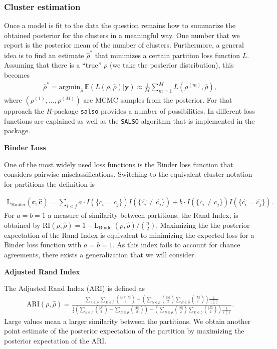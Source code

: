 \documentclass[12pt,a4paper]{article}
\begin{document}
\subsubsection{Cluster estimation}
Once a model is fit to the data the question remains how to summarize the obtained posterior for the clusters in a meaningful way. One number that we report is the posterior mean of the number of clusters. Furthermore, a general idea is to find an estimate $\hat{\rho}^*$ that minimizes a certain partition loss function $L$. Assuming that there is a ``true'' $\rho$ (we take the posterior distribution), this becomes
\begin{align*}
    \hat{\rho}^* = \text{argmin}_{\hat{\rho}} \ \mathbb{E} ( L(\rho, \hat{\rho}) | \mathbf{y} ) \approx \frac{1}{M} \sum_{m=1}^M L (\rho^{(m)} , \hat{\rho} ),
\end{align*}
where $\left( \rho^{(1)}, \dots , \rho^{(M)} \right)$ are MCMC samples from the posterior. For that approach the $R$-package \texttt{salso} \cite{salso} provides a number of possibilities. In \cite{Dahl2022-salso} different loss functions are explained as well as the \texttt{SALSO} algorithm that is implemented in the package. \medskip

\textbf{Binder Loss}

One of the most widely used loss functions is the Binder loss function that considers pairwise misclassifications. Switching to the equivalent cluster notation for partitions the definition is

\begin{align*}
    \text{L}_{\text{Binder}} (\mathbf{c}, \mathbf{\hat{c}} ) = \sum_{i<j} a \cdot  I (\{ c_i = c_j \}) I (\{ \hat{c_i} \neq \hat{c_j} \} ) +  b \cdot I (\{c_i \neq c_j \}) I (\{ \hat{c_i} = \hat{c_j} \}).
\end{align*}
For $a=b=1$ a measure of similarity between partitions, the Rand Index, is obtained by $\text{RI}(\rho, \hat{\rho}) = 1 -  \text{L}_{\text{Binder}}(\rho, \hat{\rho}) / \binom{n}{2}$. Maximizing the the posterior expectation of the Rand Index is equivalent to minimizing the expected loss for a Binder loss function with $a=b=1$. As this index fails to account for chance agreements, there exists a generalization that we will consider. \medskip

\textbf{Adjusted Rand Index}

The Adjusted Rand Index (ARI) is defined as
\begin{align*}
    \text{ARI} (\rho, \hat{\rho}) = \frac{ \sum_{s \in \rho} \sum_{E \in \hat{\rho}} \binom{| S \cap E |}{2} - \left( \sum_{S \in \rho} \binom{|S|}{2} \sum_{E \in \hat{\rho}} \binom{|E|}{2} \right) \frac{1}{\binom{n}{2}}} {\frac{1}{2} \left( \sum_{S \in \rho} \binom{|S|}{2} + \sum_{E \in \hat{\rho}} \binom{|E|}{2} \right) - \left(\sum_{S \in \rho} \binom{|S|}{2} \sum_{E \in \hat{\rho}} \binom{|E|}{2} \right) \frac{1}{\binom{n}{2}}}.
\end{align*}
Large values mean a larger similarity between the partitions. We obtain another point estimate of the posterior expectation of the partition by maximizing the posterior expectation of the ARI.
\end{document}
